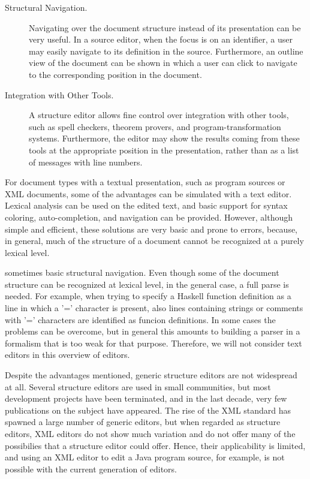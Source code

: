 \begin{description}
\item[Structural Navigation.] Navigating over the document structure instead of its presentation can be very useful. In a source editor, when the focus is on an identifier, a user may easily navigate to its definition in the source. Furthermore, an outline view of the document can be shown in which a user can click to navigate to the corresponding position in the document.

\item[Integration with Other Tools.] A structure editor allows fine control over integration with other tools, such as spell checkers, theorem provers, and program-transformation systems. Furthermore, the editor may show the results coming from these tools at the appropriate position in the presentation, rather than as a list of messages with line numbers.


\end{description}

For document types with a textual presentation, such as program sources or XML documents, some of the advantages can be simulated with a text editor. Lexical analysis can be used on the edited text, and basic support for syntax coloring, auto-completion, and navigation can be provided. However, although simple and efficient, these solutions are  very basic and prone to errors, because, in general, much of the structure of a document cannot be recognized at a purely lexical level.

\bc
sometimes basic structural navigation.  Even though some of the document structure can be recognized at lexical level, in the general case, a full parse is needed. For example, when trying to specify a Haskell function definition as a line in which a '=' character is present, also lines containing strings or comments with '=' characters are identified as funcion definitions. In some cases the problems can be overcome, but in general this amounts to building a parser in a formalism that is too weak for that purpose. Therefore, we will not consider text editors in this overview of editors.
\ec

Despite the advantages mentioned, generic structure editors are not widespread at all. Several structure editors are used in small communities, but most development projects have been terminated, and in the last decade, very few publications on the subject have appeared. The rise of the XML standard has spawned a large number of generic editors, but when regarded as structure editors, XML editors do not show much variation and do not offer many of the possibilies that a structure editor could offer. Hence, their applicability is limited, and using an XML editor to edit a Java program source, for example, is not possible with the current generation of editors.

